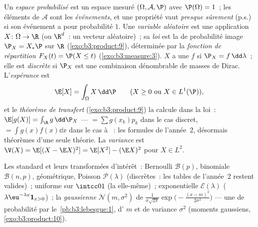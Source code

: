 \begin{definition}\label{def:b3:probability:space}
Un \emph{espace probabilisé} est un
espace mesuré $(\Omega, \mathcal A, \P)$ avec $\P(\Omega) =
1$~; les éléments de $\mathcal A$ sont les
\emph{événements}, et une propriété vaut \emph{presque
sûrement} (p.s.) si son événement a pour probabilité $1$. Une
\emph{variable aléatoire} est une
application  $X \colon \Omega \to \R$ (ou $\R^d$~:
un vecteur aléatoire)~; sa \emph{loi} est la  de probabilité image $\P_X =
X_*\P$ sur $\R$ (\cref{exo:b3:product:9}), déterminée par la
\emph{fonction de répartition} $F_X(t) = \P(X \leq t)$
(\cref{exo:b3:measure:3}). $X$ a une \emph{} $f$ si
$\P_X = f\,\dd\lambda$~; elle est \emph{discrète} si $\P_X$
est une combinaison dénombrable de masses de Dirac.
L'\emph{espérance} est
\[
\E[X] = \int_\Omega X\,\dd\P
\qquad (X \geq 0 \text{ ou } X \in L^1(\P)),
\]
et le \emph{théorème de transfert} (\cref{exo:b3:product:9})
la calcule dans la loi~: $\E[g(X)] = \int_\R g\,\dd\P_X$ ---
$= \sum g(x_k)p_k$ dans le cas discret, $= \int
g(x)f(x)\dd x$ dans le cas à ~: les formules de
l'année~2, désormais théorèmes d'une seule théorie. La
\emph{variance} est $\V(X) = \E[(X - \E X)^2] = \E[X^2] -
(\E X)^2$ pour $X \in L^2$.
\end{definition}

\begin{example}\label{ex:b3:probability:laws}
Les  standard et leurs transformées d'intérêt~:
Bernoulli $\mathcal B(p)$, binomiale $\mathcal B(n, p)$,
géométrique, Poisson $\mathcal P(\lambda)$ (discrètes~: les
tables de l'année~2 restent valides)~; uniforme sur
$\intcc01$ (la  elle-même)~; exponentielle
$\mathcal E(\lambda)$ (
$\lambda\eu^{-\lambda x}\mathbf 1_{x>0}$)~; la
\emph{gaussienne} $\mathcal N(m,
\sigma^2)$ de 
$\frac1{\sigma\sqrt{2\pi}}\exp\bigl(-\frac{(x -
m)^2}{2\sigma^2}\bigr)$ --- une  de probabilité par
le~\cref{pb:b3:lebesgue:1}, d' $m$ et de variance
$\sigma^2$ (moments gaussiens, \cref{exo:b3:product:10}).
\end{example}

